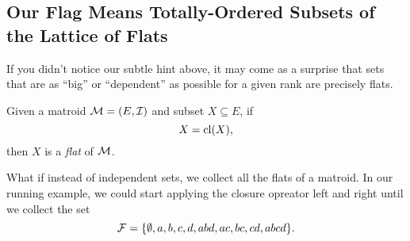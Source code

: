 \documentclass[12pt,oneside]{../../sfsuthesis}
\begin{document}
\subsection{Our Flag Means Totally-Ordered Subsets of the Lattice of Flats}

If you didn't notice our subtle hint above, it may come as a surprise that sets that are as ``big'' or ``dependent'' as possible for a given rank are precisely flats.

\begin{definition}[Flat]\th\label{def:flat}
    Given a matroid \( \mathcal{M} = (E, \mathcal{I}) \) and subset \( X \subseteq E \), if
    \[
        X = \operatorname{cl}(X),
    \]
    then \( X \) is a \emph{flat} of \( \mathcal{M} \).
\end{definition}

What if instead of independent sets, we collect all the flats of a matroid.
In our running example, we could start applying the closure opreator left and right until we collect the set
\[
    \mathcal{F} = \{ \emptyset, a, b, c, d, abd, ac, bc, cd, abcd \}.
\]
\end{document}
